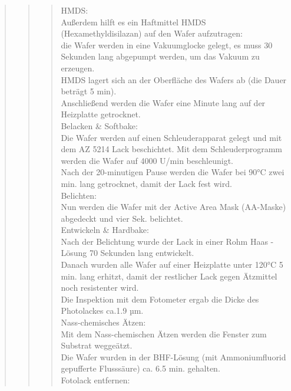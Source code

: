 \begin{quote}
\begin{quote}
\begin{quote}
			HMDS:\\

			Außerdem hilft es ein Haftmittel HMDS (Hexamethyldisilazan) auf den 
			Wafer aufzutragen:\\
			die Wafer werden in eine Vakuumglocke gelegt, es muss 30 Sekunden 
			lang abgepumpt werden, um das Vakuum zu erzeugen.\\
			HMDS  lagert sich an der Oberfläche des Wafers ab (die Dauer beträgt 
			5 min). \\
			Anschließend werden die Wafer  eine Minute lang auf der Heizplatte 
			getrocknet.\\
			
			Belacken & Softbake:\\
			
			Die  Wafer werden auf einen Schleuderapparat gelegt und mit dem AZ 
			5214  Lack beschichtet. Mit dem Schleuderprogramm werden die Wafer 
			auf 4000 U/min beschleunigt.\\
			Nach der 20-minutigen Pause werden die Wafer bei 90°C zwei min. 
			lang getrocknet, damit der Lack fest wird.\\
			
			Belichten:\\
			
			Nun werden die Wafer mit der Active Area Mask  (AA-Maske) abgedeckt 
			und vier Sek. belichtet.\\ 
			
			Entwickeln & Hardbake:\\
			
			Nach der Belichtung wurde  der Lack in einer Rohm Haas - Lösung 70 
			Sekunden lang entwickelt.\\
			Danach wurden alle Wafer auf einer Heizplatte unter 120°C 5 min. 
			lang erhitzt, damit der restlicher Lack gegen Ätzmittel noch 
			resistenter wird.\\
			Die Inspektion mit dem Fotometer ergab die Dicke des Photolackes 
			ca.1.9 µm.\\
            
            Nass-chemisches Ätzen:\\

			Mit dem Nass-chemischen Ätzen  werden die Fenster zum Substrat 
			weggeätzt.\\
			Die Wafer wurden in der BHF-Lösung (mit Ammoniumfluorid gepufferte 
			Flusssäure) ca. 6.5 min. gehalten.\\
			
			Fotolack entfernen:\\


\end{quote}
\end{quote}
\end{quote}
